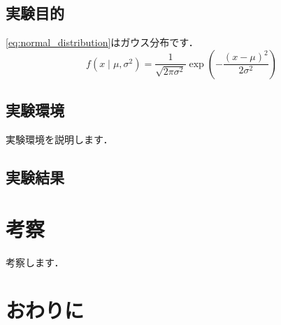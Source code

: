 \subsection{実験目的}
\label{sec:exp_purpose}

\eqref{eq:normal_distribution}はガウス分布です．
\begin{equation}
  f(x \mid \mu, \sigma^2) = \frac{1}{\sqrt{2\pi\sigma^2}} \exp\left(-\frac{(x-\mu)^2}{2\sigma^2}\right)
  \label{eq:normal_distribution}
\end{equation}



\subsection{実験環境}
\label{sec:exp_environment}

実験環境を説明します．


\subsection{実験結果}
\label{sec:exp_results}



\section{考察}
\label{sec:exp_discussion}



考察します．
\section{おわりに}